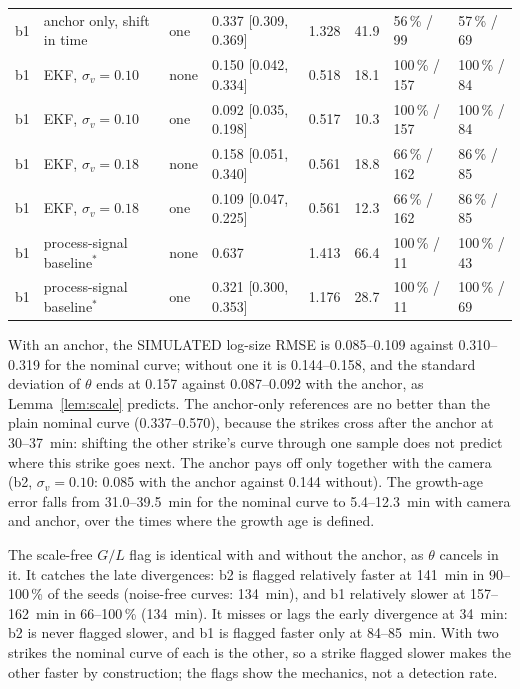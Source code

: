 \begin{table}
\begin{tabular}{@{}llllrrll@{}}
b1 & anchor only, shift in time & one & 0.337 [0.309, 0.369] & 1.328 & 41.9 & 56\,\% / 99 & 57\,\% / 69 \\
b1 & EKF, $\sigma_v = 0.10$ & none & 0.150 [0.042, 0.334] & 0.518 & 18.1 & 100\,\% / 157 & 100\,\% / 84 \\
b1 & EKF, $\sigma_v = 0.10$ & one & 0.092 [0.035, 0.198] & 0.517 & 10.3 & 100\,\% / 157 & 100\,\% / 84 \\
b1 & EKF, $\sigma_v = 0.18$ & none & 0.158 [0.051, 0.340] & 0.561 & 18.8 & 66\,\% / 162 & 86\,\% / 85 \\
b1 & EKF, $\sigma_v = 0.18$ & one & 0.109 [0.047, 0.225] & 0.561 & 12.3 & 66\,\% / 162 & 86\,\% / 85 \\
b1 & process-signal baseline$^\ast$ & none & 0.637 & 1.413 & 66.4 & 100\,\% / 11 & 100\,\% / 43 \\
b1 & process-signal baseline$^\ast$ & one & 0.321 [0.300, 0.353] & 1.176 & 28.7 & 100\,\% / 11 & 100\,\% / 69 \\
\bottomrule
\end{tabular}
\end{table}

With an anchor, the SIMULATED log-size RMSE is 0.085--0.109 against 0.310--0.319 for the nominal curve; without one
it is 0.144--0.158, and the standard deviation of $\theta$ ends at 0.157 against 0.087--0.092 with the anchor, as
Lemma~\ref{lem:scale} predicts. The anchor-only references are no better than the plain nominal curve (0.337--0.570),
because the strikes cross after the anchor at 30--37~min: shifting the other strike's curve through one sample does
not predict where this strike goes next. The anchor pays off only together with the camera (b2, $\sigma_v = 0.10$:
0.085 with the anchor against 0.144 without). The growth-age error falls from 31.0--39.5~min for the nominal curve to
5.4--12.3~min with camera and anchor, over the times where the growth age is defined.

The scale-free $G/L$ flag is identical with and without the anchor, as $\theta$ cancels in it. It catches the late
divergences: b2 is flagged relatively faster at 141~min in 90--100\,\% of the seeds (noise-free curves: 134~min), and
b1 relatively slower at 157--162~min in 66--100\,\% (134~min). It misses or lags the early divergence at 34~min: b2 is
never flagged slower, and b1 is flagged faster only at 84--85~min. With two strikes the nominal curve of each is the
other, so a strike flagged slower makes the other faster by construction; the flags show the mechanics, not a
detection rate.

